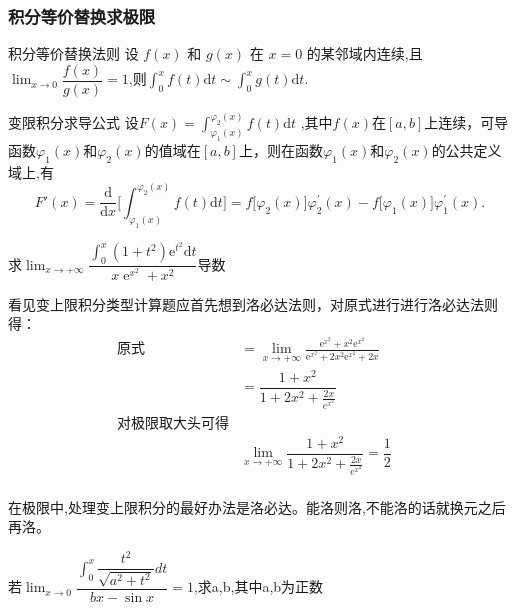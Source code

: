 \documentclass[9pt a4paper, oneside, UTF8]{ctexbook}
\begin{document}
\begin{sloppypar}
    \subsubsection{积分等价替换求极限}
    \begin{defn}{积分等价替换法则}{}
        设 $f(x)$ 和 $g(x)$ 在 $x=0$ 的某邻域内连续,且$\operatorname*{lim}_{x\rightarrow0}\dfrac{f(x)}{g(x)}=1$,则$\int_{0}^{x}f(t)\mathrm{d}t\sim\int_{0}^{x}g(t)\mathrm{d}t.$ \label{BSXJF1}
    \end{defn}
    \begin{defn}{变限积分求导公式}{}
        设$F( x) = \int _{\varphi_1( x) }^{\varphi_2( x) }f( t) $d$t$ ,其中$f(x)$在$[a,b]$上连续，可导函数$\varphi_1(x)$和$\varphi_2(x)$的值域在$[a,b]$上，则在函数$\varphi_1(x)$和$\varphi_2(x)$的公共定义域上,有
        $$
        F'(x)=\frac{\mathrm{d}}{\mathrm{d}x}\biggl[\int_{\varphi_{1}(x)}^{\varphi_{2}(x)}f(t)\mathrm{d}t\biggr]=f\bigl[\varphi_{2}(x)\bigr]\varphi_{2}^{\prime}(x)-f\bigl[\varphi_{1}(x)\bigr]\varphi_{1}^{\prime}(x).
        $$
    \end{defn}
    \begin{problem}
        求$\lim_{x\to+\infty}\dfrac{\int_0^x(1+t^2)\mathrm{e}^{t^2}\mathrm{d}t}{x\operatorname{e}^{x^2}+x^2}$导数
    \end{problem}
    \begin{solution}
        看见变上限积分类型计算题应首先想到洛必达法则，对原式进行进行洛必达法则得：
            \begin{align*}
                \text{原式} & =\lim_{x\to+\infty}\frac{\mathrm{e}^{x^2}+{x^2\mathrm{e}^{x^2}}}{\mathrm{e}^{x^2}+2x^2\mathrm{e}^{x^2}+2x}  & \\
                & =\dfrac{1+x^2}{1+2x^2+\frac{2x}{e^{x^2}}} & \\
                \text{对极限取大头可得} & \\
                & \lim_{x\to +\infty} \dfrac{1+x^2}{1+2x^2+\frac{2x}{e^{x^2}}} = \dfrac{1}{2}  & \\
            \end{align*}
    \end{solution}
    \begin{note}
    在极限中,处理变上限积分的最好办法是洛必达。能洛则洛,不能洛的话就换元之后再洛。
    \end{note}
    \begin{problem}
        若$\operatorname*{lim}_{x \to 0}\dfrac{\int_{0}^{x}\dfrac{t^{2}}{\sqrt{a^{2}+t^{2}}}dt}{bx-\sin x}=1$,求a,b,其中a,b为正数
    \end{problem}

\end{sloppypar}
\end{document}
